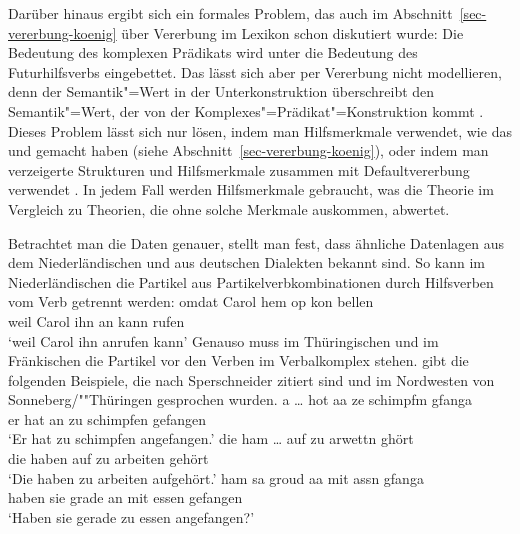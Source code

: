 Darüber hinaus ergibt sich ein formales Problem, das auch im Abschnitt~\ref{sec-vererbung-koenig} 
über Vererbung im Lexikon schon diskutiert wurde: Die Bedeutung des komplexen Prädikats wird unter
die Bedeutung des Futurhilfsverbs eingebettet. Das lässt sich aber per Vererbung nicht modellieren,
denn der Semantik"=Wert in der Unterkonstruktion überschreibt den Semantik"=Wert, der von der
Komplexes"=Prädikat"=Konstruktion kommt \citep[Abschnitt~4.2]{MuellerPersian}. Dieses Problem lässt sich nur lösen, indem man Hilfsmerkmale
verwendet, wie das \citet[]{Kathol94a} und \citet[67--68]{Koenig99a} gemacht haben (siehe Abschnitt~\ref{sec-vererbung-koenig}),
oder indem man verzeigerte Strukturen und Hilfsmerkmale zusammen mit Defaultvererbung verwendet 
\citep{MuellerDefaults}. In jedem Fall werden Hilfsmerkmale gebraucht, was die Theorie im Vergleich
zu Theorien, die ohne solche Merkmale auskommen, abwertet.%
\largerpage

Betrachtet man die Daten genauer, stellt man fest, dass ähnliche Datenlagen aus dem Niederländischen
und aus deutschen Dialekten bekannt sind. So kann im Niederländischen
die Partikel aus Partikelverbkombinationen
durch Hilfsverben vom Verb getrennt werden:
\ea
\gll omdat Carol hem op kon  bellen\footnotemark\\
     weil  Carol ihn an kann rufen\\
\glt `weil Carol ihn anrufen kann'
\z
Genauso muss im Thüringischen und im Fränkischen die Partikel vor den
Verben im Verbalkomplex stehen. \citet*[]{Werner94a} gibt die folgenden Beispiele,
die nach Sperschneider zitiert sind
und im Nordwesten von Sonneberg/""Thüringen gesprochen wurden.
\eal
\label{ex-sonneberg-partikel-phasen}
\ex{}
\gll a  \ldots{} hot aa   ze schimpfm  gfanga\\
     er {}       hat an   zu schimpfen gefangen\\
\glt `Er hat zu schimpfen angefangen.'
\ex{}
\gll die  ham  \ldots{}  auf  zu arwettn ghört\\
     die haben {}        auf  zu arbeiten gehört\\
\glt `Die haben zu arbeiten aufgehört.'
\ex
\gll ham   sa  groud  aa mit assn  gfanga\\
     haben sie grade  an mit essen gefangen\\
\glt `Haben sie gerade zu essen angefangen?'
\zl

